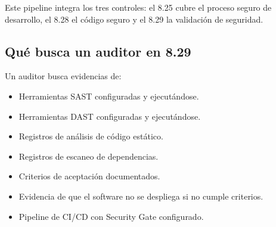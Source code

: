 Este pipeline integra los tres controles: el 8.25 cubre el proceso seguro de desarrollo, el 8.28 el código seguro y el 8.29 la validación de seguridad.

\subsection{Qué busca un auditor en 8.29}

Un auditor busca evidencias de:

\begin{itemize}
    \item Herramientas SAST configuradas y ejecutándose.
    \item Herramientas DAST configuradas y ejecutándose.
    \item Registros de análisis de código estático.
    \item Registros de escaneo de dependencias.
    \item Criterios de aceptación documentados.
    \item Evidencia de que el software no se despliega si no cumple criterios.
    \item Pipeline de CI/CD con Security Gate configurado.
\end{itemize}
